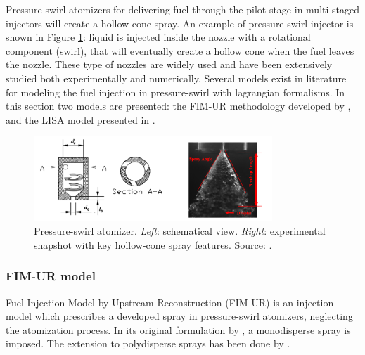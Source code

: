 Pressure-swirl atomizers for delivering fuel through the pilot stage in multi-staged injectors will create a hollow cone spray. An example of pressure-swirl injector is shown in Figure \ref{fig:hollow_cone_view}: liquid is injected inside the nozzle with a rotational component (swirl), that will eventually create a hollow cone when the fuel leaves the nozzle. These type of nozzles are widely used and have been extensively studied both experimentally and numerically. Several models exist in literature for modeling the fuel injection in pressure-swirl with lagrangian formalisms. In this section two models are presented: the FIM-UR methodology developed by , and the LISA model presented in .

\begin{figure}[ht]
    \centering
    \includegraphics[width=0.8\textwidth]{./part1_numerical_approaches/figures_ch3/pressure-swirl-atomizer-wei}
       \centering
    \caption[Pressure-swirl atomizer]{Pressure-swirl atomizer.  \textsl{Left}: schematical view. \textsl{Right}: experimental snapshot with key hollow-cone spray features. Source: .}
    \label{fig:hollow_cone_view}
\end{figure}







\subsubsection*{FIM-UR model}

Fuel Injection Model by Upstream Reconstruction (FIM-UR) is an injection model which prescribes a developed spray in pressure-swirl atomizers, neglecting the atomization process. In its original formulation by , a monodisperse spray is imposed. The extension to polydisperse sprays has been done by .



